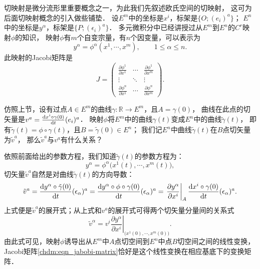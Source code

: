 切映射是微分流形里重要概念之一，为此我们先叙述欧氏空间的切映射，
这可为后面切映射概念的引入做些铺垫．
设$E^m$中的坐标是$x^i$，标架是$\{O;(e_i)^a\}$；
$E^n$中的坐标是$y^\alpha$，标架是$\{P;(\epsilon_i)^a\}$．
多元微积分中已经讲授过从$E^m$到$E^n$的$C^r$映射$\phi$的知识，
映射$\phi$有$m$个自变宗量，有$n$个因变量，可以表示为
\begin{equation}
    y^\alpha = \phi^\alpha(x^1,\cdots,x^m), \qquad 1 \leqslant \alpha \leqslant n.
\end{equation}
此映射的Jacobi矩阵是
\begin{equation}\label{chdm:eqn_jabobi-matrix}
    J=\begin{pmatrix}
        \frac{\partial \phi^1}{\partial x^1} & \cdots & \frac{\partial \phi^1}{\partial x^m} \\ 
        \vdots & \ddots & \vdots \\
        \frac{\partial \phi^n}{\partial x^1} & \cdots & \frac{\partial \phi^n}{\partial x^m}
    \end{pmatrix}.
\end{equation}

仿照上节，设有过点$A\in E^m$的曲线$\gamma:\mathbb{R}\to E^m$，且$A=\gamma(0)$，
曲线在此点的切矢量是$v^a=\frac{{\rm d} x^i\circ\gamma(0)}{{\rm d} t}(e_i)^a$．
映射$\phi$将$E^m$中的曲线$\gamma(t)$变成$E^n$中的曲线$\tilde{\gamma}(t)$，
即有$\tilde{\gamma}(t)= \phi\circ\gamma(t)$，且$B=\tilde{\gamma}(0)\in E^n$；
我们记$E^n$中曲线$\tilde{\gamma}(t)$在$B$点切矢量为$\tilde{v}^a$，
那么$\tilde{v}^a$与$v^a$有什么关系？

依照前面给出的参数方程，我们知道$\tilde{\gamma}(t)$的参数方程为：
\begin{equation}
    y^\alpha = \phi^\alpha\bigl(x^1(t),\cdots,x^m(t)\bigr),
\end{equation}
切矢量$\tilde{v}^a$自然是对曲线$\tilde{\gamma}(t)$的方向导数：
\begin{equation}\label{chdm:eqn_qysall}
    \tilde{v}^a = \frac{{\rm d} y^\alpha\circ\tilde{\gamma}(0)}{{\rm d} t}(\epsilon_\alpha)^a
    =\frac{{\rm d} y^\alpha\circ\phi\circ{\gamma}(0)}{{\rm d} t}(\epsilon_\alpha)^a
    =\left.\frac{\partial y^\alpha}{\partial x^i} \right|_{A}
    \frac{{\rm d} x^i\circ{\gamma}(0)}{{\rm d} t}(\epsilon_\alpha)^a .
\end{equation}  %
上式便是$\tilde{v}^a$的展开式；从上式和$v^a$的展开式可得两个切矢量分量间的关系式
\begin{equation}\label{chdm:eqn_QieYingShe-inEV-compents}
    \tilde{v}^\alpha = v^i \left.\frac{\partial y^\alpha}{\partial x^i} 
      \right|_{\bigl(x^1(0),\cdots,x^m(0)\bigr)} .
\end{equation}
由此式可见，映射$\phi$诱导出从$E^m$中$A$点切空间到$E^n$中点$B$切空间之间的线性变换，
Jacobi矩阵\eqref{chdm:eqn_jabobi-matrix}恰好是这个线性变换在相应基底下的变换矩阵．

